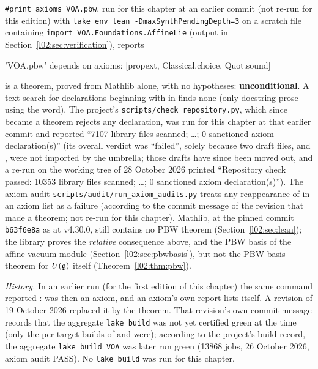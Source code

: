 \begin{status}
\texttt{\#print axioms VOA.pbw}, run for this chapter at an earlier commit (not re-run for this edition) with
\texttt{lake env lean -DmaxSynthPendingDepth=3} on a scratch file containing
\texttt{import VOA.Foundations.AffineLie} (output in Section~\ref{l02:sec:verification}), reports
\begin{plaincode}
'VOA.pbw' depends on axioms: [propext, Classical.choice, Quot.sound]
\end{plaincode}
 is a theorem, proved from Mathlib alone, with no hypotheses: \textbf{unconditional}. A text
search for declarations beginning with  in  finds none (only
docstring prose using the word). The project's \texttt{scripts/check\_repository.py}, which since 
became a theorem rejects any  declaration, was run for this chapter at that earlier commit and
reported ``7107 library files scanned; \ldots; 0 sanctioned axiom declaration(s)'' (its overall verdict was
``failed'', solely because two draft files,  and
, were not imported by the umbrella; those drafts have since
been moved out, and a re-run on the working tree of 28 October 2026 printed ``Repository check passed: 10353
library files scanned; \ldots; 0 sanctioned axiom declaration(s)''). The axiom audit
\texttt{scripts/audit/run\_axiom\_audits.py} treats any reappearance of  in an axiom list as a
failure (according to the commit message of the revision that made  a theorem; not re-run for this chapter). Mathlib, at the pinned commit \texttt{b63f6e8a} as at v4.30.0, still contains no PBW theorem
(Section~\ref{l02:sec:lean}); the library proves the \emph{relative} consequence above, and the PBW basis of
the affine vacuum module (Section~\ref{l02:sec:pbwbasis}), but not the PBW basis theorem for $U(\mathfrak{g})$
itself (Theorem~\ref{l02:thm:pbw}).

\emph{History.} In an earlier run (for the first edition of this chapter) the same
command reported :  was then an axiom, and an
axiom's own report lists itself. A revision of 19 October 2026 replaced it by the theorem.
That revision's own commit message records that the aggregate \texttt{lake build} was not yet certified green at
the time (only the per-target builds of  and  were);
according to the project's build record, the aggregate \texttt{lake build VOA} was later run green
(13868 jobs, 26 October 2026, axiom audit PASS). No \texttt{lake build} was run for this chapter.
\end{status}

